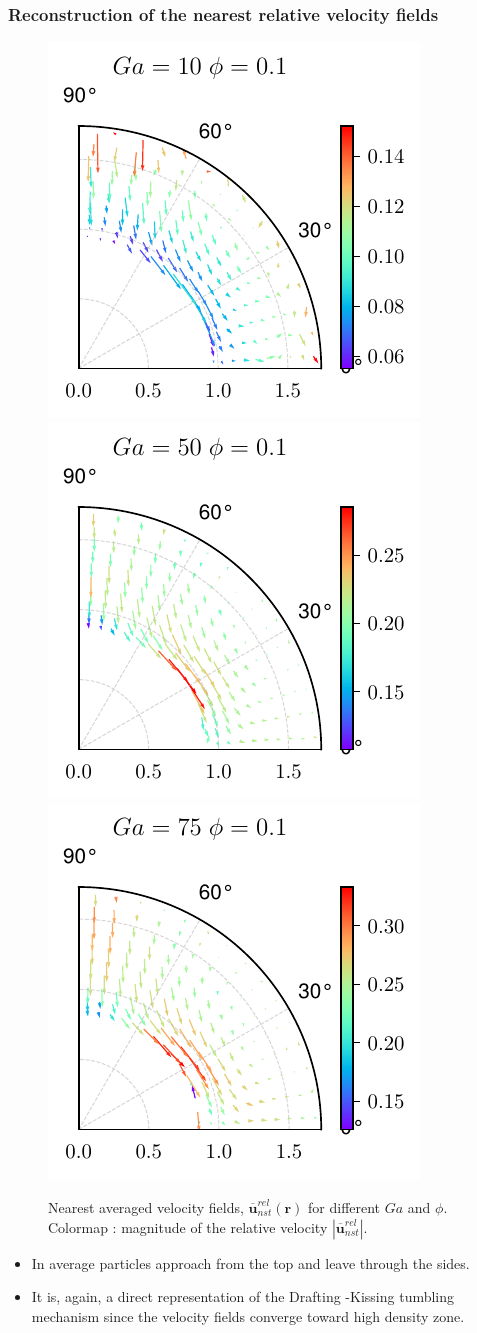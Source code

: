 \documentclass{sintefbeamer}
\newcommand{\nstrelavg}[1]{\overline{#1}_{nst}^{rel}}
\begin{document}
\begin{frame}
  \frametitle{Reconstruction of the nearest relative velocity fields}

  \begin{figure}
    
    \includegraphics[height=0.25\textwidth]{image/HOMOGENEOUS/fDrop/U_mu_r_0_1_Ga_10_PHI_0_1.pdf}
    \includegraphics[height=0.25\textwidth]{image/HOMOGENEOUS/fDrop/U_mu_r_0_1_Ga_50_PHI_0_1.pdf}
    \includegraphics[height=0.25\textwidth]{image/HOMOGENEOUS/fDrop/U_mu_r_0_1_Ga_75_PHI_0_1.pdf}
    
    \caption{Nearest averaged velocity fields, $\nstrelavg{\textbf{u}} (\textbf{r})$ for different $Ga$ and $\phi$. 
    Colormap : magnitude of the relative velocity $|\nstrelavg{\textbf{u}}|$. }
  \end{figure}

\begin{itemize}
  \item In average particles approach from the top and leave through the sides. 
  \item It is, again, a direct representation of the Drafting -Kissing tumbling mechanism since the velocity fields converge toward high density zone. 
\end{itemize}
\end{frame}
\end{document}
